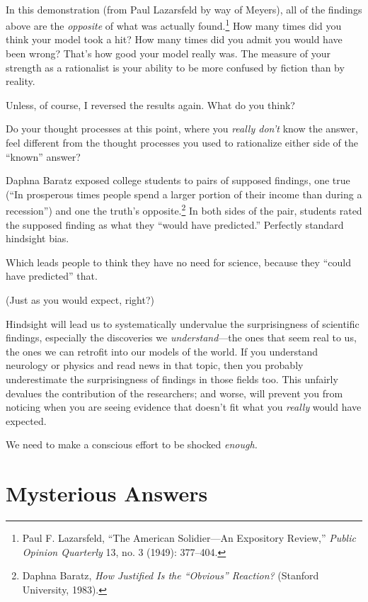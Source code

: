 {
 ~}

{
 In this demonstration (from Paul Lazarsfeld by way of Meyers), all
of the findings above are the \textit{opposite} of what was actually
found.\footnote{Paul F. Lazarsfeld, ``The American
Solidier---An Expository Review,'' \textit{Public
Opinion Quarterly} 13, no. 3 (1949): 377--404.} How many times did you think your model took
a hit? How many times did you admit you would have been wrong?
That's how good your model really was. The measure of
your strength as a rationalist is your ability to be more confused by
fiction than by reality.}

{
 Unless, of course, I reversed the results again. What do you
think?}

{
 Do your thought processes at this point, where you \textit{really
don't} know the answer, feel different from the thought
processes you used to rationalize either side of the
``known'' answer?}

{
 Daphna Baratz exposed college students to pairs of supposed
findings, one true (``In prosperous times people spend
a larger portion of their income than during a
recession'') and one the truth's
opposite.\footnote{Daphna Baratz, \textit{How Justified Is the
``Obvious'' Reaction?} (Stanford
University, 1983).} In both sides of the pair, students rated
the supposed finding as what they ``would have
predicted.'' Perfectly standard hindsight bias.}

{
 Which leads people to think they have no need for science, because
they ``could have predicted'' that.}

{
 (Just as you would expect, right?)}

{
 Hindsight will lead us to systematically undervalue the
surprisingness of scientific findings, especially the discoveries we
\textit{understand}{}---the ones that seem real to us, the ones we can
retrofit into our models of the world. If you understand neurology or
physics and read news in that topic, then you probably underestimate
the surprisingness of findings in those fields too. This unfairly
devalues the contribution of the researchers; and worse, will prevent
you from noticing when you are seeing evidence that
doesn't fit what you \textit{really} would have
expected.}

{
 We need to make a conscious effort to be shocked \textit{enough.}}

\myendsectiontext


\bigskip

\chapter{Mysterious Answers}

